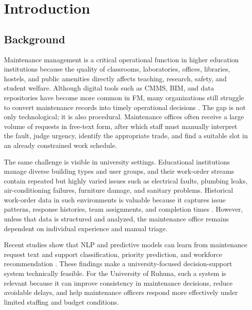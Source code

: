 \documentclass[11pt,a4paper]{report}
\begin{document}
\tableofcontents
\newpage

\listoffigures
\newpage

\listoftables
\newpage

\acuseall
\printacronyms
\newpage

\setcounter{secnumdepth}{3}

\chapter{Introduction}
\section{Background}
Maintenance management is a critical operational function in higher education institutions because the quality of classrooms, laboratories, offices, libraries, hostels, and public amenities directly affects teaching, research, safety, and student welfare. Although digital tools such as \ac{CMMS}, \ac{BIM}, and data repositories have become more common in \ac{FM}, many organizations still struggle to convert maintenance records into timely operational decisions \cite{matarneh2019,yang2019}. The gap is not only technological; it is also procedural. Maintenance offices often receive a large volume of requests in free-text form, after which staff must manually interpret the fault, judge urgency, identify the appropriate trade, and find a suitable slot in an already constrained work schedule.

The same challenge is visible in university settings. Educational institutions manage diverse building types and user groups, and their work-order streams contain repeated but highly varied issues such as electrical faults, plumbing leaks, air-conditioning failures, furniture damage, and sanitary problems. Historical work-order data in such environments is valuable because it captures issue patterns, response histories, team assignments, and completion times \cite{besiktepe2019}. However, unless that data is structured and analyzed, the maintenance office remains dependent on individual experience and manual triage.

Recent studies show that \ac{NLP} and predictive models can learn from maintenance request text and support classification, priority prediction, and workforce recommendation \cite{bouabdallaoui2020,mo2020,dorazio2023,ensafi2024}. These findings make a university-focused decision-support system technically feasible. For the University of Ruhuna, such a system is relevant because it can improve consistency in maintenance decisions, reduce avoidable delays, and help maintenance officers respond more effectively under limited staffing and budget conditions.
\end{document}
